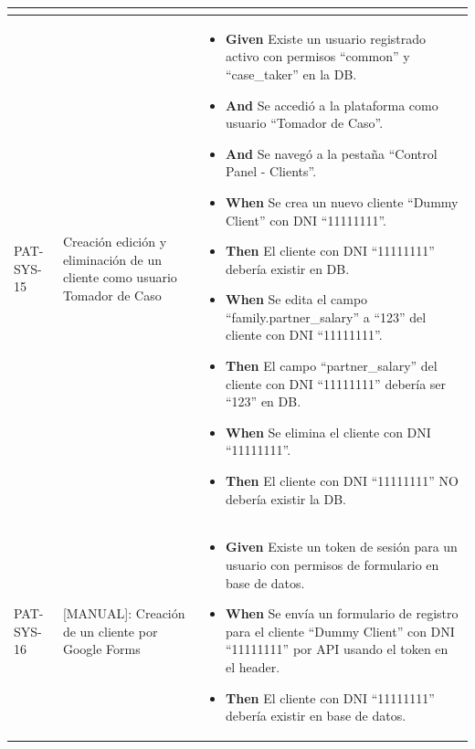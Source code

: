 \begin{longtable}{|p{1cm}|p{2.5cm}|p{12cm}|}
\begin{itemize}
    \end{itemize}
    \\
    \hline
    PAT-SYS-15 & Creación edición y eliminación de un cliente como usuario Tomador de Caso & 
    \begin{itemize}
        \item \textbf{Given} Existe un usuario registrado activo con permisos ``common'' y ``case\_taker'' en la DB.
        \item \textbf{And} Se accedió a la plataforma como usuario ``Tomador de Caso''.
        \item \textbf{And} Se navegó a la pestaña ``Control Panel - Clients''.
        \newline
        \item \textbf{When}  Se crea un nuevo cliente ``Dummy Client'' con DNI ``11111111''.
        \newline
        \item \textbf{Then} El cliente con DNI ``11111111'' deber\'ia existir en DB.
        \newline
        \item \textbf{When} Se edita el campo ``family.partner\_salary'' a ``123'' del cliente con DNI ``11111111''.
        \newline
        \item \textbf{Then} El campo ``partner\_salary'' del cliente con DNI ``11111111'' deber\'ia ser ``123'' en DB.
        \newline
        \item \textbf{When} Se elimina el cliente con DNI ``11111111''.
        \newline
        \item \textbf{Then} El cliente con DNI ``11111111'' NO deber\'ia existir la DB.
    \end{itemize}
    \\
    \hline
    PAT-SYS-16& [MANUAL]: Creación de un cliente por Google Forms & 
    \begin{itemize}
        \item \textbf{Given} Existe un token de sesión para un usuario con permisos de formulario en base de datos.
        \newline
        \item \textbf{When} Se envía un formulario de registro para el cliente ``Dummy Client'' con DNI ``11111111'' por API usando el token en el header.
        \newline
        \item \textbf{Then} El cliente con DNI ``11111111'' debería existir en base de datos.

\end{itemize}
\end{longtable}
